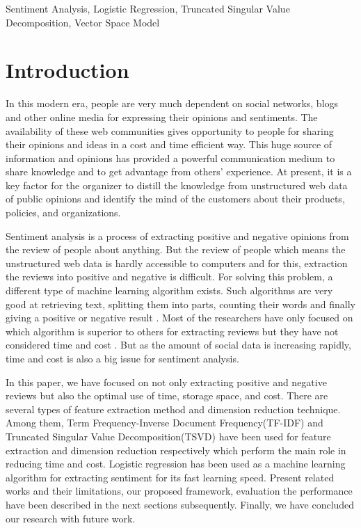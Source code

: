 \documentclass[10pt, conference]{IEEEtran}
\begin{document}
	\begin{IEEEkeywords}
		Sentiment Analysis, Logistic Regression, Truncated Singular Value Decomposition, Vector Space Model
	\end{IEEEkeywords}
	\section{Introduction}
	In this modern era, people are very much dependent on social networks, blogs and other online media for expressing their opinions and sentiments. The availability of these web communities gives opportunity to people for sharing their opinions and ideas in a cost and time efficient way. This huge source of information and opinions has provided a powerful communication medium to share knowledge and to get advantage from others’ experience. At present, it is a key factor for the organizer to distill the knowledge from unstructured web data of public opinions and identify the mind of the customers about their products, policies, and organizations.
	
	Sentiment analysis is a process of extracting positive and negative opinions from the review of people about anything. But the review of people which means the unstructured web data is hardly accessible to computers and for this, extraction the reviews into positive and negative is difficult. For solving this problem, a different type of machine learning algorithm exists. Such algorithms are very good at retrieving text, splitting them into parts, counting their words and finally giving a positive or negative result \cite{b1, b2}. Most of the researchers have only focused on which algorithm is superior to others for extracting reviews but they have not considered time and cost \cite{b10 , b11, b12, b13, b14, b15, b16}. But as the amount of social data is increasing rapidly, time and cost is also a big issue for sentiment analysis.

	In this paper, we have focused on not only extracting positive and negative reviews but also the optimal use of time, storage space, and cost. There are several types of feature extraction method and dimension reduction technique. Among them, Term Frequency-Inverse Document Frequency(TF-IDF) and Truncated Singular Value Decomposition(TSVD) have been used for feature extraction and dimension reduction respectively which perform the main role in reducing time and cost. Logistic regression has been used as a machine learning algorithm for extracting sentiment for its fast learning speed. Present related works and their limitations, our proposed framework, evaluation the performance have been described in the next sections subsequently. Finally, we have concluded our research with future work.
	
\end{document}
